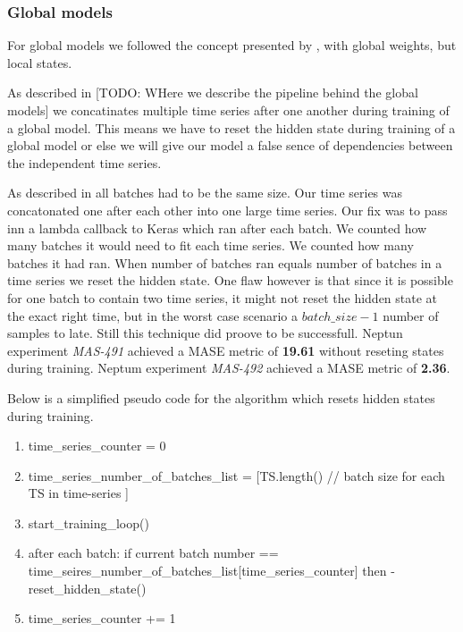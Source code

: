 \subsubsection{Global models}
For global models we followed the concept presented by \cite{Smyl2020},
with global weights, but local states.

As described in [TODO: WHere we describe the pipeline behind the global models]
we concatinates multiple time series after one another during training of a global model.
This means we have to reset the hidden state during training of a global model
or else we will give our model a false sence of dependencies between
the independent time series.

As described in  all
batches had to be the same size. Our time series was concatonated one after
each other into one large time series.
Our fix was to pass inn a lambda callback to Keras which ran after each batch.
We counted how many batches it would need to fit each time series.
We counted how many batches it had ran. When number of batches ran equals
number of batches in a time series we reset the hidden state.
One flaw however is that since it is possible for one batch to
contain two time series, it might not reset the hidden state at the exact
right time, but in the worst case scenario a $batch\_size - 1$ number of
samples to late. Still this technique did proove to be successfull.
Neptun experiment \textit{MAS-491} achieved a MASE metric of \textbf{19.61}
without reseting states during training.
Neptum experiment \textit{MAS-492} achieved a MASE metric of \textbf{2.36}.

Below is a simplified pseudo code for the algorithm which resets hidden states
during training.
\begin{enumerate}
  \item time\_series\_counter = 0
  \item time\_series\_number\_of\_batches\_list = [TS.length() // batch size for each TS in time-series ]
  \item start\_training\_loop()
  \item after each batch: if current batch number ==
        time\_seires\_number\_of\_batches\_list[time\_series\_counter]
        then -\> reset\_hidden\_state()
  \item time\_series\_counter += 1
\end{enumerate}